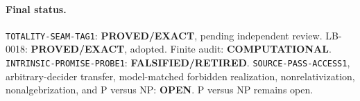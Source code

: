 \documentclass[11pt]{article}
\newcommand{\EXACT}{\textbf{PROVED/EXACT}}
\newcommand{\COMP}{\textbf{COMPUTATIONAL}}
\newcommand{\OPEN}{\textbf{OPEN}}
\newcommand{\RETIRED}{\textbf{FALSIFIED/RETIRED}}
\begin{document}
\paragraph{Final status.}
\texttt{TOTALITY-SEAM-TAG1}: \EXACT, pending independent review.
LB-0018: \EXACT, adopted.  Finite audit: \COMP.
\texttt{INTRINSIC-PROMISE-PROBE1}: \RETIRED.
\texttt{SOURCE-PASS-ACCESS1}, arbitrary-decider transfer, model-matched
forbidden realization, nonrelativization, nonalgebrization, and P versus NP:
\OPEN.  P versus NP remains open.

\end{document}

